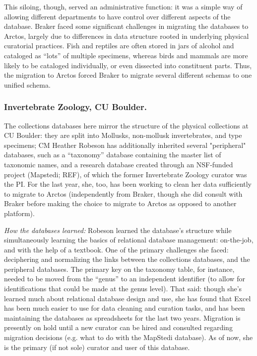 This siloing, though, served an administrative function: it was a simple way of allowing different departments to have control over different aspects of the database.  Braker faced some significant challenges in migrating the databases to Arctos, largely due to differences in data structure rooted in underlying physical curatorial practices.  Fish and reptiles are often stored in jars of alcohol and cataloged as “lots” of multiple specimens, whereas birds and mammals are more likely to be cataloged individually, or even dissected into constituent parts.  Thus, the migration to Arctos forced Braker to migrate several different schemas to one unified schema.

\subsubsection{Invertebrate Zoology, CU Boulder.}

The collections databases here mirror the structure of the physical collections at CU Boulder: they are split into Mollusks, non-mollusk invertebrates, and type specimens; CM Heather Robeson has additionally inherited several "peripheral" databases, such as a “taxonomy” database containing the master list of taxonomic names, and a research database created through an NSF-funded project (Mapstedi; REF), of which the former Invertebrate Zoology curator was the PI.  For the last year, she, too, has been working to clean her data sufficiently to migrate to Arctos (independently from Braker, though she did consult with Braker before making the choice to migrate to Arctos as opposed to another platform). 

\textit{How the databases learned:} Robeson learned the database’s structure while simultaneously learning the basics of relational database management: on-the-job, and with the help of a textbook. One of the primary challenges she faced: deciphering and normalizing the links between the collections databases, and the peripheral databases.  The primary key on the taxonomy table, for instance, needed to be moved from the “genus” to an independent identifier (to allow for identifications that could be made at the genus level).  That said: though she’s learned much about relational database design and use, she has found that Excel has been much easier to use for data cleaning and curation tasks, and has been maintaining the databases as spreadsheets for the last two years.  Migration is presently on hold until a new curator can be hired and consulted regarding migration decisions (e.g. what to do with the MapStedi database).  As of now, she is the primary (if not sole) curator and user of this database.

